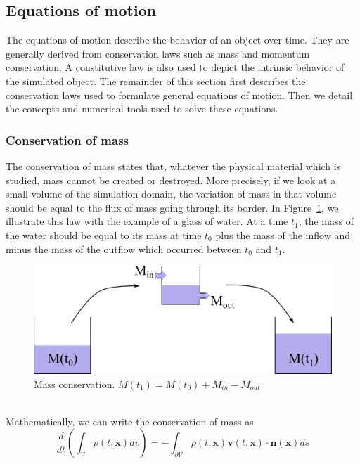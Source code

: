 \subsection{Equations of motion}
\label{subsec:starMechanics_motionEquation}
The equations of motion describe the behavior of an object over time.
They are generally derived from conservation laws such as mass and momentum conservation. 
A constitutive law is also used to depict the intrinsic behavior of the simulated object.
The remainder of this section first describes the conservation laws used to formulate general equations of motion.
Then we detail the concepts and numerical tools used to solve these equations.

\subsubsection{Conservation of mass}
\label{subsubsec:starMechanics_massConservation}
The conservation of mass states that, whatever the physical material which is studied, mass cannot be created or destroyed.
More precisely, if we look at a small volume of the simulation domain, the variation of mass in that volume should be equal to the flux of mass going through its border.
In Figure~\ref{fig:massConservation}, we illustrate this law with the example of a glass of water.
At a time $t_{1}$, the mass of the water should be equal to its mass at time $t_{0}$ plus the mass of the inflow and minus the mass of the outflow which occurred between $t_{0}$ and $t_{1}$.
\begin{figure}[!h]
	\centering
	\includegraphics[width=\linewidth]{images/continuum_mechanics/massConservation.png}
	\caption[STAR mechanics: Mass conservation]{\label{fig:massConservation} Mass conservation. $M(t_{1}) = M(t_{0}) + M_{in} - M_{out}$}
\end{figure}
\\
Mathematically, we can write the conservation of mass as
\begin{equation}
    \label{eq:massConservation}
    \displaystyle 
    \frac{d}{dt}\left( \int_{\mathcal{V}} \rho(t,\mathbf{x}) dv \right)
    =
    - \int_{\mathcal{\partial V}}\rho(t,\mathbf{x})\mathbf{v}(t,\mathbf{x}) \cdot \mathbf{n}(\mathbf{x}) ds
\end{equation}
